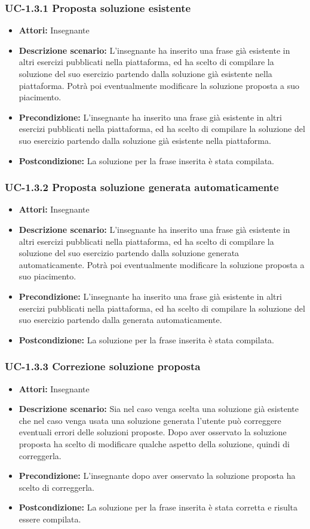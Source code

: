 \subsubsection{UC-1.3.1 Proposta soluzione esistente}
\begin{itemize}
\item \textbf{Attori: }Insegnante
\item \textbf{Descrizione scenario: }L'insegnante ha inserito una frase già esistente in altri esercizi pubblicati nella piattaforma, ed ha scelto di compilare la soluzione del suo esercizio partendo dalla soluzione già esistente nella piattaforma. Potrà poi eventualmente modificare la soluzione proposta a suo piacimento.
\item \textbf{Precondizione: }L'insegnante ha inserito una frase già esistente in altri esercizi pubblicati nella piattaforma, ed ha scelto di compilare la soluzione del suo esercizio partendo dalla soluzione già esistente nella piattaforma.
\item \textbf{Postcondizione: }La soluzione per la frase inserita è stata compilata.
\end{itemize}
\subsubsection{UC-1.3.2 Proposta soluzione generata automaticamente}
\begin{itemize}
\item \textbf{Attori: }Insegnante
\item \textbf{Descrizione scenario: }L'insegnante ha inserito una frase già esistente in altri esercizi pubblicati nella piattaforma, ed ha scelto di compilare la soluzione del suo esercizio partendo dalla soluzione generata automaticamente. Potrà poi eventualmente modificare la soluzione proposta a suo piacimento.
\item \textbf{Precondizione: }L'insegnante ha inserito una frase già esistente in altri esercizi pubblicati nella piattaforma, ed ha scelto di compilare la soluzione del suo esercizio partendo dalla generata automaticamente.
\item \textbf{Postcondizione: }La soluzione per la frase inserita è stata compilata.
\end{itemize}
\subsubsection{UC-1.3.3 Correzione soluzione proposta}
\begin{itemize}
\item \textbf{Attori: }Insegnante
\item \textbf{Descrizione scenario: }Sia nel caso venga scelta una soluzione già esistente che nel caso venga usata una soluzione generata l'utente può correggere eventuali errori delle soluzioni proposte. Dopo aver osservato la soluzione proposta ha scelto di modificare qualche aspetto della soluzione, quindi di correggerla.
\item \textbf{Precondizione: }L'insegnante dopo aver osservato la soluzione proposta ha scelto di correggerla.
\item \textbf{Postcondizione: }La soluzione per la frase inserita è stata corretta e risulta essere compilata.
\end{itemize}
